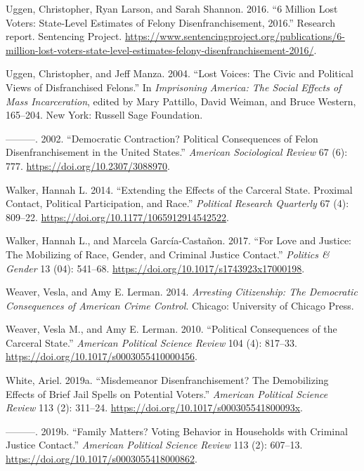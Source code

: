 \documentclass[
  12pt,
]{article}
\newlength{\cslhangindent}
\newenvironment{cslreferences}%
  {\setlength{\parindent}{0pt}%
  \everypar{\setlength{\hangindent}{\cslhangindent}}\ignorespaces}%
  {\par}
\begin{document}
\begin{cslreferences}
\leavevmode\hypertarget{ref-sentencing_2016}{}%
Uggen, Christopher, Ryan Larson, and Sarah Shannon. 2016. ``6 Million Lost Voters: State-Level Estimates of Felony Disenfranchisement, 2016.'' Research report. Sentencing Project. \url{https://www.sentencingproject.org/publications/6-million-lost-voters-state-level-estimates-felony-disenfranchisement-2016/}.

\leavevmode\hypertarget{ref-Uggen2004}{}%
Uggen, Christopher, and Jeff Manza. 2004. ``Lost Voices: The Civic and Political Views of Disfranchised Felons.'' In \emph{Imprisoning America: The Social Effects of Mass Incarceration}, edited by Mary Pattillo, David Weiman, and Bruce Western, 165--204. New York: Russell Sage Foundation.

\leavevmode\hypertarget{ref-Uggen2002}{}%
---------. 2002. ``Democratic Contraction? Political Consequences of Felon Disenfranchisement in the United States.'' \emph{American Sociological Review} 67 (6): 777. \url{https://doi.org/10.2307/3088970}.

\leavevmode\hypertarget{ref-Walker2014}{}%
Walker, Hannah L. 2014. ``Extending the Effects of the Carceral State. Proximal Contact, Political Participation, and Race.'' \emph{Political Research Quarterly} 67 (4): 809--22. \url{https://doi.org/10.1177/1065912914542522}.

\leavevmode\hypertarget{ref-Walker2017}{}%
Walker, Hannah L., and Marcela García-Castañon. 2017. ``For Love and Justice: The Mobilizing of Race, Gender, and Criminal Justice Contact.'' \emph{Politics \& Gender} 13 (04): 541--68. \url{https://doi.org/10.1017/s1743923x17000198}.

\leavevmode\hypertarget{ref-Weaver2014}{}%
Weaver, Vesla, and Amy E. Lerman. 2014. \emph{Arresting Citizenship: The Democratic Consequences of American Crime Control}. Chicago: University of Chicago Press.

\leavevmode\hypertarget{ref-Weaver2010}{}%
Weaver, Vesla M., and Amy E. Lerman. 2010. ``Political Consequences of the Carceral State.'' \emph{American Political Science Review} 104 (4): 817--33. \url{https://doi.org/10.1017/s0003055410000456}.

\leavevmode\hypertarget{ref-White2019}{}%
White, Ariel. 2019a. ``Misdemeanor Disenfranchisement? The Demobilizing Effects of Brief Jail Spells on Potential Voters.'' \emph{American Political Science Review} 113 (2): 311--24. \url{https://doi.org/10.1017/s000305541800093x}.

\leavevmode\hypertarget{ref-White2019a}{}%
---------. 2019b. ``Family Matters? Voting Behavior in Households with Criminal Justice Contact.'' \emph{American Political Science Review} 113 (2): 607--13. \url{https://doi.org/10.1017/s0003055418000862}.


\end{cslreferences}
\end{document}
